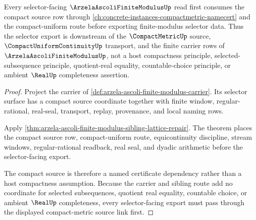 \begin{theorem}
\label{thm:arzela-ascoli-finite-modulus-compactmetric-source-link}
Every selector-facing $\ArzelaAscoliFiniteModulusUp$ read first consumes the compact source row through \autoref{ch:concrete-instances-compactmetric-namecert} and the compact-uniform route before exporting finite-modulus selector data. Thus the selector export is downstream of the $\CompactMetricUp$ source, $\CompactUniformContinuityUp$ transport, and the finite carrier rows of $\ArzelaAscoliFiniteModulusUp$, not a host compactness principle, selected-subsequence principle, quotient-real equality, countable-choice principle, or ambient $\RealUp$ completeness assertion.
\end{theorem}
\begin{proof}
Project the carrier of \autoref{def:arzela-ascoli-finite-modulus-carrier}. Its selector surface has a compact source coordinate together with finite window, regular-rational, real-seal, transport, replay, provenance, and local naming rows.

Apply \autoref{thm:arzela-ascoli-finite-modulus-sibling-lattice-repair}. The theorem places the compact source row, compact-uniform route, equicontinuity discipline, stream windows, regular-rational readback, real seal, and dyadic arithmetic before the selector-facing export.

The compact source is therefore a named certificate dependency rather than a host compactness assumption. Because the carrier and sibling route add no coordinate for selected subsequences, quotient real equality, countable choice, or ambient $\RealUp$ completeness, every selector-facing export must pass through the displayed compact-metric source link first.
\end{proof}
